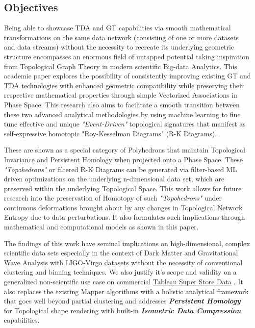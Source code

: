 \subsection{Objectives}

Being able to showcase TDA and GT capabilities via smooth mathematical transformations on the same data network (consisting of one or more datasets and data streams) without the necessity to recreate its underlying geometric structure encompasses an enormous field of untapped potential taking inspiration from Topological Graph Theory \cite{17.0_2001TGTIntro} \cite{17.1_2012foundationsTGT}  in modern scientific Big-data Analytics.\cite{02.6_2009TDAChallenges}\cite{18.0_2016topologicalBigChem} \cite{18.2_2018TDAonBigData} This academic paper explores the possibility of consistently improving existing GT and TDA technologies with enhanced geometric compatibility while preserving their respective mathematical properties through simple Vectorized Associations in Phase Space.\cite{19.0_2010PhaseSpace} This research also aims to facilitate a smooth transition between these two advanced analytical methodologies by using machine learning to fine tune effective and unique \textit{"Event-Driven"} topological signatures that manifest as self-expressive homotopic\cite{07_bjorner2003Homotopy} \cite{03.1_2009simplicialHomotopy} "Roy-Kesselman Diagrams" (R-K Diagrams).

These are shown as a special category of Polyhedrons that maintain Topological Invariance\cite{12.1_2002topologicalInvariaceProjection} \cite{01.0_2010introductionTopoPropertiesInvariance} and Persistent Homology when projected onto a Phase Space. These \textit{"Topohedrons"} or filtered R-K Diagrams can be generated via filter-based ML driven optimizations on the underlying n-dimensional data set, which are preserved within the underlying Topological Space. This work allows for future research into the preservation of Homotopy of such \textit{"Topohedrons"} under continuous deformations brought about by any changes in Topological Network Entropy due to data perturbations. It also formulates such implications through mathematical and computational models as shown in this paper.\cite{05.1_2007computingTopoEntropy}

The findings of this work have seminal implications on high-dimensional, complex scientific data sets especially in the context of Dark Matter and Gravitational Wave  Analysis\cite{00_LIGOOpenSciData} \cite{00.1_2012GWAnalysisFormalism} with LIGO-Virgo datasets without the necessity of conventional clustering and binning techniques. \cite{00.2_schutz2012GWDataAnalysis}We also justify it's scope and validity on a generalized non-scientific use case on commercial \hyperref[sec:store_sales_section]{Tableau Super Store Data}
. It also replaces the existing Mapper algorithms \cite{01.9_2007MapperPBG} with a holistic analytical framework that goes well beyond partial clustering and addresses \textbf{\textit{Persistent Homology}} \cite{01.1_1stCourse2018algebraicTopo} \cite{06.4_2005computingPHomology} for Topological shape rendering with built-in  \textbf{\textit{Isometric Data Compression}} capabilities.\cite{01.0_2010introductionTopoPropertiesInvariance} \cite{21.0_2016TopoCompression} \cite{12.2_compressingTopoNetworkGraphs}
